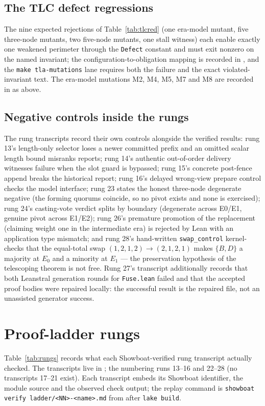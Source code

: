\documentclass[10pt,journal,letterpaper]{IEEEtran}
\newcommand{\code}[1]{\texttt{#1}}
\begin{document}
\subsection{The TLC defect regressions}
The nine expected rejections of Table~\ref{tab:tlcred} (one era-model mutant,
five three-node mutants, two five-node mutants, one stall witness) each
enable exactly one weakened perimeter through the \code{Defect} constant and
must exit nonzero on the named invariant; the configuration-to-obligation
mapping is recorded in , and the \code{make
tla-mutations} lane requires both the failure and the exact violated-invariant
text. The era-model mutations M2, M4, M5, M7 and M8 are recorded in
 as above.

\subsection{Negative controls inside the rungs}
The rung transcripts record their own controls alongside the verified
results: rung 13's length-only selector loses a newer committed prefix and an
omitted scalar length bound misranks reports; rung 14's authentic
out-of-order delivery witnesses failure when the slot guard is bypassed;
rung 15's concrete post-fence append breaks the historical report; rung 16's
delayed wrong-view prepare control checks the model interface; rung 23 states
the honest three-node degenerate negative (the forming quorums coincide, so
no pivot exists and none is exercised); rung 24's casting-vote verdict splits
by boundary (degenerate across E0/E1, genuine pivot across E1/E2); rung 26's
premature promotion of the replacement (claiming weight one in the
intermediate era) is rejected by Lean with an application type mismatch; and
rung 28's hand-written \code{swap\_control} kernel-checks that the
equal-total swap $(1,2,1,2)\to(2,1,2,1)$ makes $\{B,D\}$ a majority at $E_0$
and a minority at $E_1$ --- the preservation hypothesis of the telescoping
theorem is not free. Rung 27's transcript additionally records that both
Leanstral generation rounds for \code{Fuse.lean} failed and that the accepted
proof bodies were repaired locally: the successful result is the repaired
file, not an unassisted generator success.

\section{Proof-ladder rungs}\label{sec:rungs}
Table~\ref{tab:rungs} records what each Showboat-verified rung transcript
actually checked. The transcripts live in
; the numbering runs 13--16 and
22--28 (no transcripts 17--21 exist). Each transcript embeds its Showboat
identifier, the module source and the observed check output; the replay
command is \code{showboat verify ladder/<NN>-<name>.md} from
 after \code{lake build}.
\end{document}
